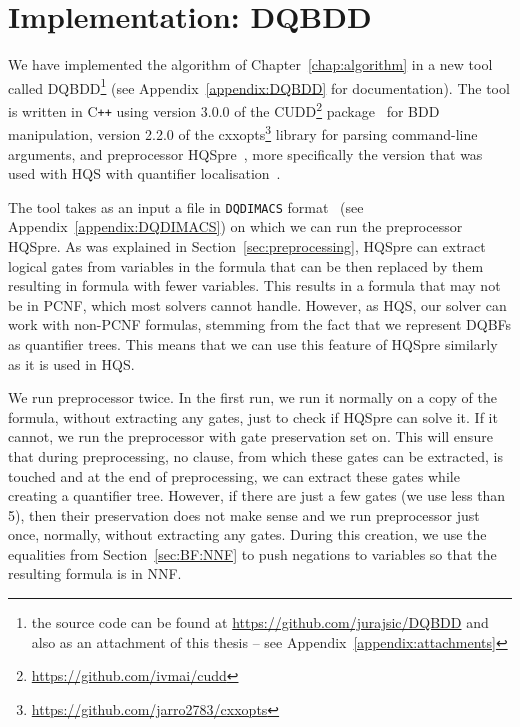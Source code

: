 \documentclass[
  digital, %
  color,
  twoside, %
  table,   %
  nolof,     %
  nolot,     %
]{fithesis3}
\theoremstyle{definition}
\theoremstyle{remark}
\newcommand{\DQDIMACS}[0]{\texttt{DQDIMACS}}
\newcommand{\Cplusplus}{C\texttt{++}}
\begin{document}
\begin{itemize}
\end{itemize}


\chapter{Implementation: DQBDD}
\label{chap:implementation}
\begin{sloppypar}
We have implemented the algorithm of Chapter~\ref{chap:algorithm} in a new tool called DQBDD\footnote{the source code can be found at \url{https://github.com/jurajsic/DQBDD} and also as an attachment of this thesis -- see Appendix~\ref{appendix:attachments}} (see Appendix~\ref{appendix:DQBDD} for documentation). The tool is written in \Cplusplus{} using version 3.0.0 of the CUDD\footnote{\url{https://github.com/ivmai/cudd}} package~\cite{CUDD} for BDD manipulation, version 2.2.0 of the cxxopts\footnote{\url{https://github.com/jarro2783/cxxopts}} library for parsing command-line arguments, and pre\-pro\-ces\-sor HQSpre~\cite{HQSpre2}, more specifically the version that was used with HQS with quantifier localisation~\cite{HQSquantifierLocalisation}.
\end{sloppypar}

The tool takes as an input a file in \DQDIMACS{} format~\cite{iDQandDQDIMACS} (see Appendix~\ref{appendix:DQDIMACS}) on which we can run the preprocessor HQSpre. As was explained in Section~\ref{sec:preprocessing}, HQSpre can extract logical gates from variables in the formula that can be then replaced by them resulting in formula with fewer variables. This results in a formula that may not be in PCNF, which most solvers cannot handle. However, as HQS, our solver can work with non-PCNF formulas, stemming from the fact that we represent DQBFs as quantifier trees. This means that we can use this feature of HQSpre similarly as it is used in HQS.

We run preprocessor twice. 
In the first run, we run it normally on a copy of the formula, without extracting any gates, just to check if HQSpre can solve it. If it cannot, we run the preprocessor with gate preservation set on. This will ensure that during preprocessing, no clause, from which these gates can be extracted, is touched and at the end of preprocessing, we can extract these gates while creating a quantifier tree. However, if there are just a few gates (we use less than 5), then their preservation does not make sense and we run preprocessor just once, normally, without extracting any gates. During this creation, we use the equalities from Section~\ref{sec:BF:NNF} to push negations to variables so that the resulting formula is in NNF.
\end{document}

